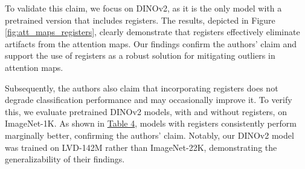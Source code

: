 \documentclass[10pt]{article} \usepackage[preprint]{tmlr}
\begin{document}
To validate this claim, we focus on DINOv2, as it is the only model with a pretrained version that includes registers. The results, depicted in Figure \ref{fig:att_maps_registers}, clearly demonstrate that registers effectively eliminate artifacts from the attention maps. 
Our findings confirm the authors' claim and support the use of registers as a robust solution for mitigating outliers in attention maps.
 
Subsequently, the authors also claim that incorporating registers does not degrade classification performance and may occasionally improve it. To verify this, we evaluate pretrained DINOv2 models, with and without registers, on ImageNet-1K. As shown in \hyperref[tab:dino_results]{Table 4}, models with registers consistently perform marginally better, confirming the authors' claim. Notably, our DINOv2 model was trained on LVD-142M rather than ImageNet-22K, demonstrating the generalizability of their findings.
\end{document}
